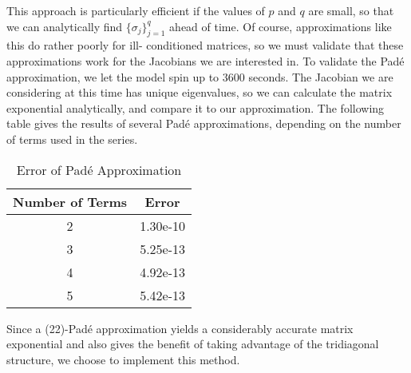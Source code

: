 \documentclass{csri19}
\begin{document}
This approach is particularly efficient if the values of $p$ and $q$ are 
small, so that we can analytically find $\{\sigma_j\}_{j=1}^q$ ahead of 
time. Of course, approximations like this do rather poorly for ill-
conditioned matrices, so we must validate that these approximations work 
for the Jacobians we are interested in. To validate the Pad\'e 
approximation, we let the model spin up to $3600$ seconds. The Jacobian 
we are considering at this time has unique eigenvalues, so we can calculate
 the matrix exponential analytically, and compare it to our approximation.
The following table gives the results of several Pad\'e approximations, 
depending on the number of terms used in the series.
\begin{table}[ht]
  \begin{center}
    \caption{Error of Pad\'e Approximation}
    \label{CFK:tab:PadeError}
    \begin{tabular}{|c|c|}
      \hline
      \textbf{Number of Terms} & \textbf{Error}\\
      \hline
      2 & 1.30e-10 \\
      3 & 5.25e-13 \\
      4 & 4.92e-13 \\
      5 & 5.42e-13 \\
      \hline
    \end{tabular}
  \end{center}
\end{table}

Since a (22)-Pad\'e approximation yields a considerably accurate matrix 
exponential and also gives the benefit of taking advantage of the 
tridiagonal structure, we choose to implement this method.
\end{document}
